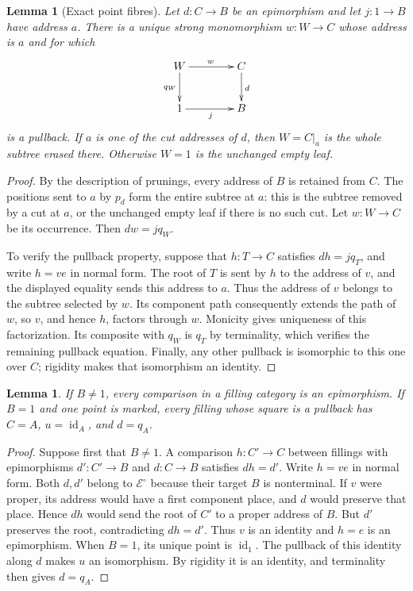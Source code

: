 \documentclass[11pt,a4paper]{article}
\theoremstyle{plain}
\newtheorem{lemma}[theorem]{Lemma}
\theoremstyle{definition}
\theoremstyle{remark}
\newcommand{\Icat}{\mathcal E^\circ}
\newcommand{\one}{1}
\newcommand{\id}{\operatorname{id}}
\begin{document}
\begin{lemma}[Exact point fibres]\label{lem:fibres}
Let $d:C\to B$ be an epimorphism and let $j:\one\to B$ have address $a$.
There is a unique strong monomorphism $w:W\to C$ whose address is $a$ and for which
\[
 \xymatrix@C=4em@R=2.5em{
W \ar[r]^{w} \ar[d]_{q_W} & C \ar[d]^{d} \\
  \one \ar[r]_{j} & B
 }
\]
is a pullback. If $a$ is one of the cut addresses of $d$,
then $W=C|_a$ is the whole subtree erased there. Otherwise
$W=\one$ is the unchanged empty leaf.
\end{lemma}
\begin{proof}
By the description of prunings, every address of $B$ is retained
from $C$. The positions sent to $a$ by $p_d$ form the entire subtree
at $a$: this is the subtree removed by a cut at $a$, or the unchanged
empty leaf if there is no such cut. Let $w:W\to C$ be its occurrence.
Then $dw=jq_W$.

To verify the pullback property, suppose that $h:T\to C$ satisfies
$dh=jq_T$, and write $h=ve$ in normal form. The root of $T$ is
sent by $h$ to the address of $v$, and the displayed equality sends
this address to $a$. Thus the address of $v$ belongs to the subtree
selected by $w$. Its component path consequently extends the path
of $w$, so $v$, and hence $h$, factors through $w$. Monicity gives
uniqueness of this factorization. Its composite with $q_W$ is $q_T$
by terminality, which verifies the remaining pullback equation.
Finally, any other pullback is isomorphic to this one over $C$;
rigidity makes that isomorphism an identity.
\end{proof}

\begin{lemma}\label{lem:comparisons}
If $B\ne\one$, every comparison in a filling category is an epimorphism.
If $B=\one$ and one point is marked, every filling whose square
is a pullback has
$C=A$, $u=\id_A$, and $d=q_A$.
\end{lemma}
\begin{proof}
Suppose first that $B\ne\one$. A comparison $h:C'\to C$
between fillings with epimorphisms $d':C'\to B$ and
$d:C\to B$ satisfies $dh=d'$. Write $h=ve$ in normal form.
Both $d,d'$ belong to $\Icat$ because their target $B$ is
nonterminal. If $v$ were proper, its address would have a first
component place, and $d$ would preserve that place. Hence $dh$
would send the root of $C'$ to a proper address of $B$. But $d'$
preserves the root, contradicting $dh=d'$. Thus $v$ is an
identity and $h=e$ is an epimorphism.
When $B=\one$, its unique point is $\id_\one$. The pullback of
this identity along $d$ makes $u$ an isomorphism. By rigidity it
is an identity, and terminality then gives $d=q_A$.
\end{proof}
\end{document}
